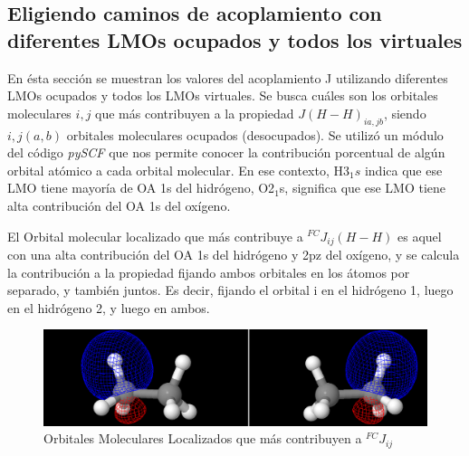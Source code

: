 \documentclass[
	12pt, %
]{fphw}
\begin{document}
\subsection*{Eligiendo caminos de acoplamiento con diferentes LMOs ocupados y todos los virtuales}

En ésta sección se muestran los valores del acoplamiento J utilizando diferentes LMOs ocupados y todos los LMOs virtuales.
Se busca cuáles son los orbitales moleculares $i,j$ que más contribuyen a la propiedad $J(H-H)_{ia,jb}$, siendo
$i,j (a,b)$ orbitales moleculares ocupados (desocupados). Se utilizó un módulo del código \textit{pySCF} que nos
permite conocer la contribución porcentual de algún orbital atómico a cada orbital molecular. 
En ese contexto, H3$_1s$ indica que ese LMO tiene mayoría de OA 1s del hidrógeno,
O2$_1$s, significa que ese LMO tiene alta contribución del OA 1s del oxígeno.




El Orbital molecular localizado que más contribuye a $^{FC}J_{ij}(H-H)$ es aquel con una alta contribución del OA
1s del hidrógeno y 2pz del oxígeno, y se calcula la contribución a la propiedad fijando ambos orbitales en los 
átomos por separado, y también juntos. Es decir, fijando el orbital i en el hidrógeno 1, luego en el hidrógeno 2,
y luego en ambos.   

\begin{figure}[h]
	\centering
	\includegraphics*[scale=0.3]{occ_c2h6}
	\caption{Orbitales Moleculares Localizados que más contribuyen a $^{FC}J_{ij}$}
\end{figure}	
\end{document}
